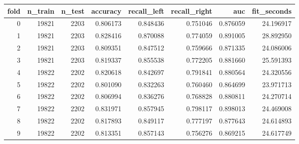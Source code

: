 \begin{tabular}{rrrrrrrr}
\toprule
fold & n_train & n_test & accuracy & recall_left & recall_right & auc & fit_seconds \\
\midrule
0 & 19821 & 2203 & 0.806173 & 0.848436 & 0.751046 & 0.876059 & 24.196917 \\
1 & 19821 & 2203 & 0.828416 & 0.870088 & 0.774059 & 0.891005 & 28.892950 \\
2 & 19821 & 2203 & 0.809351 & 0.847512 & 0.759666 & 0.871335 & 24.086006 \\
3 & 19821 & 2203 & 0.819337 & 0.855538 & 0.772205 & 0.881660 & 25.591393 \\
4 & 19822 & 2202 & 0.820618 & 0.842697 & 0.791841 & 0.880564 & 24.320556 \\
5 & 19822 & 2202 & 0.801090 & 0.832263 & 0.760460 & 0.864699 & 23.971713 \\
6 & 19822 & 2202 & 0.806994 & 0.836276 & 0.768828 & 0.880811 & 24.270714 \\
7 & 19822 & 2202 & 0.831971 & 0.857945 & 0.798117 & 0.898013 & 24.469008 \\
8 & 19822 & 2202 & 0.817893 & 0.849117 & 0.777197 & 0.877643 & 24.614893 \\
9 & 19822 & 2202 & 0.813351 & 0.857143 & 0.756276 & 0.869215 & 24.617749 \\
\bottomrule
\end{tabular}
